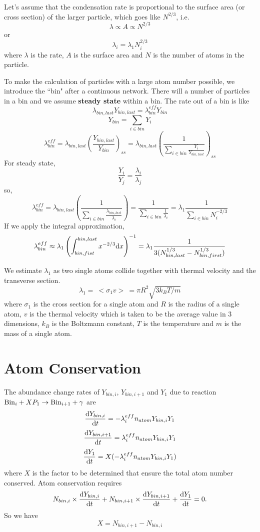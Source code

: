 \documentclass{article}
\begin{document}
Let's assume that the condensation rate is proportional to the surface area
(or cross section) of the larger particle, which goes like $N^{2/3}$, i.e.
\[
\lambda \propto A \propto N^{2/3}
\]
or
\[
\lambda_i = \lambda_1 N_i^{2/3}
\]
where $\lambda$ is the rate, $A$ is the surface area and $N$ is the number 
of atoms in the particle.

To make the calculation of particles with a large atom number possible, we 
introduce
the ``bin" after a continuous network. There will a number of particles in a 
bin and we assume \textbf{steady state} within a bin.
The rate out of a bin is like
\[
\lambda_{bin,last}Y_{bin,last} = \lambda^{eff}_{bin}Y_{bin}
\]
\[
Y_{bin} = \sum_{i\in bin} Y_i
\]
\[
\lambda^{eff}_{bin} = \lambda_{bin,last} \left(
  \frac{Y_{bin,last}}{Y_{bin}}
  \right)_{ss}
  = \lambda_{bin,last} \left(
  \frac{1}{\sum_{i\in bin} \frac{Y_i}{Y_{bin,last}} }
  \right)_{ss}
\]
For steady state,
\[
\frac{Y_i}{Y_j} = \frac{\lambda_i}{\lambda_j}
\]
so,
\[
\lambda^{eff}_{bin} = \lambda_{bin,last} \left(
  \frac{1}{\sum_{i\in bin} \frac{\lambda_{bin,last}}{\lambda_i} }
  \right)
  = \frac{1}{\sum_{i\in bin} \frac{1}{\lambda_i} }
  = \lambda_1 \frac{1}{\sum_{i\in bin} N_i^{-2/3}}
\]
If we apply the integral approximation,
\begin{equation}
\lambda^{eff}_{bin}
  \approx \lambda_1 \left( \int_{bin,fist}^{bin,last} x^{-2/3} {\rm d} x
  \right)^{-1}
  = \lambda_1 \frac{1}{3(N_{bin,last}^{1/3} - N_{bin,first}^{1/3})}
\label{eq:rate}
\end{equation}

We estimate $\lambda_1$ as two single atoms collide together with thermal 
velocity and the transverse section.
\begin{equation}
\lambda_1 = \: <\! \sigma_1 v\! > \: = \pi R^2 \sqrt{3k_BT/m}
\label{eq:k1}
\end{equation}
where $\sigma_1$ is the cross section for a single atom and $R$ is the radius
of a single atom, $v$ is the thermal velocity which is taken to be the average
value in 3 dimensions, $k_B$ is the Boltzmann constant, $T$ is the temperature
and $m$ is the mass of a single atom.

\section{Atom Conservation}

The abundance change rates of $Y_{bin,i}$, $Y_{bin,i+1}$ and $Y_1$
due to 
reaction ${\rm Bin}_i + X P_1 \to {\rm Bin}_{i+1} + \gamma$ are
\[
\frac{{\rm d}Y_{bin,i}}{{\rm d}t} =
  -\lambda_i^{eff} n_{atom} Y_{bin,i} Y_1
\]
\[
\frac{{\rm d}Y_{bin,i+1}}{{\rm d}t} =
  \lambda_i^{eff} n_{atom} Y_{bin,i} Y_1
\]
\[
\frac{{\rm d}Y_1}{{\rm d}t} =
  X( -\lambda_i^{eff} n_{atom} Y_{bin,i} Y_1 )
\]
where $X$ is the factor to be determined that ensure
the total atom number conserved. Atom conservation requires
\[
N_{bin,i} \times \frac{{\rm d}Y_{bin,i}}{{\rm d}t} +
N_{bin,i+1} \times \frac{{\rm d}Y_{bin,i+1}}{{\rm d}t} +
\frac{{\rm d}Y_1}{{\rm d}t} = 0.
\] 
So we have
\[
X = N_{bin,i+1} - N_{bin,i}
\]
\end{document}
